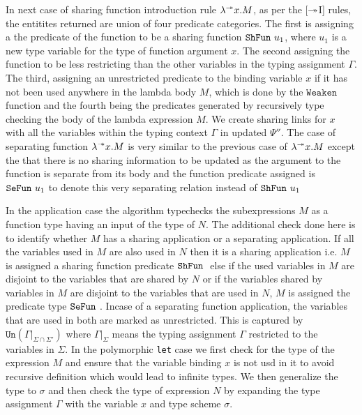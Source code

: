 In next case of sharing function introduction rule $\lambda^{\twoheadrightarrow}x.M$, as per the [$\twoheadrightarrow$I] rules, the entitites returned
are union of four predicate categories. The first is assigning a the predicate of the function to be
a sharing function $\texttt{ShFun}\ u_1$, where $u_1$ is a new type variable for the type of function argument $x$.
The second assigning the function to be less restricting than the other variables in the typing assignment $\Gamma$.
The third, assigning an unrestricted predicate to the binding variable $x$ if it has not been used
anywhere in the lambda body $M$, which is done by the $\texttt{Weaken}$ function and the fourth
being the predicates generated by recursively type checking the body of the lambda expression $M$.
We create sharing links for $x$ with all the variables within the typing context $\Gamma$ in updated
$\Psi''$.
The case of separating function $\lambda^{\mathrel{-\mkern-6mu*}} x. M$ is very similar to the previous case of $\lambda^{\twoheadrightarrow}x. M$ except
the that there is no sharing information to be updated as the argument to the function is
separate from its body and the function predicate assigned is $\texttt{SeFun}\ u_1$ to denote this very
separating relation instead of $\texttt{ShFun}\ u_1$

In the application case the algorithm typechecks the subexpressions $M$ as a function type having
an input of the type of $N$. The additional check done here is to identify whether $M$ has a sharing
application or a separating application. If all the variables used in $M$ are also used in $N$ then
it is a sharing application i.e. $M$ is assigned a sharing function predicate $\texttt{ShFun}\ $
else if the used variables in $M$ are disjoint to the variables that
are shared by $N$ or if the variables shared by variables in $M$ are disjoint to the variables
that are used in $N$, $M$ is assigned the predicate type $\texttt{SeFun}\ $. Incase of a separating function
application, the variables that are used in both are marked as unrestricted. This is captured by
$\texttt{Un}(\Gamma|_{\Sigma \cap \Sigma'})$ where $\Gamma|_{\Sigma}$ means the typing assignment $\Gamma$
restricted to the variables in $\Sigma$.
In the polymorphic \texttt{let} case we first check for the type of the expression $M$ and
ensure that the variable binding $x$ is not usd in it to avoid recursive definition which would
lead to infinite types. We then generalize the type to $\sigma$ and then check the type of expression $N$
by expanding the type assignment $\Gamma$ with the variable $x$ and type scheme $\sigma$.

